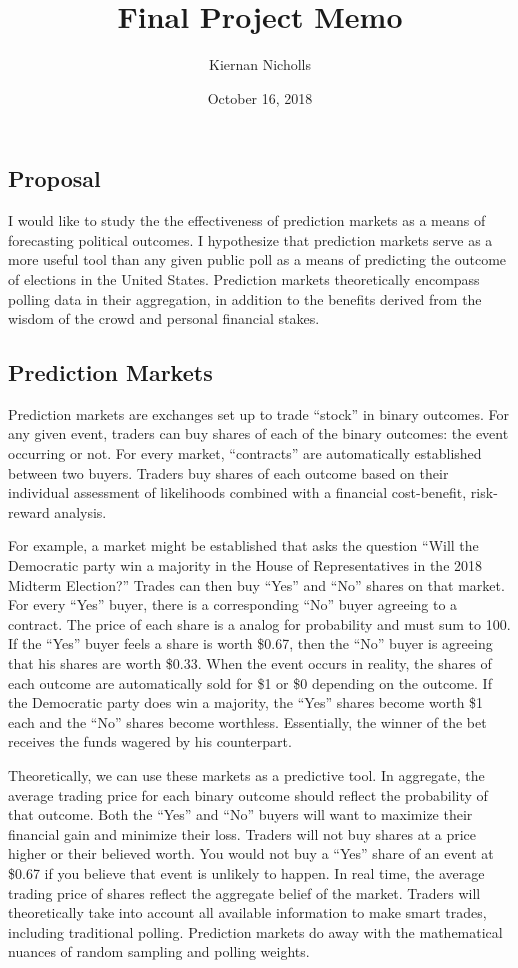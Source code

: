 \documentclass[]{article}
\title{Final Project Memo}
\author{Kiernan Nicholls}
\date{October 16, 2018}
\begin{document}
\maketitle

\subsection{Proposal}\label{proposal}

I would like to study the the effectiveness of prediction markets as a
means of forecasting political outcomes. I hypothesize that prediction
markets serve as a more useful tool than any given public poll as a
means of predicting the outcome of elections in the United States.
Prediction markets theoretically encompass polling data in their
aggregation, in addition to the benefits derived from the wisdom of the
crowd and personal financial stakes.

\subsection{Prediction Markets}\label{prediction-markets}

Prediction markets are exchanges set up to trade ``stock'' in binary
outcomes. For any given event, traders can buy shares of each of the
binary outcomes: the event occurring or not. For every market,
``contracts'' are automatically established between two buyers. Traders
buy shares of each outcome based on their individual assessment of
likelihoods combined with a financial cost-benefit, risk-reward
analysis.

For example, a market might be established that asks the question ``Will
the Democratic party win a majority in the House of Representatives in
the 2018 Midterm Election?'' Trades can then buy ``Yes'' and ``No''
shares on that market. For every ``Yes'' buyer, there is a corresponding
``No'' buyer agreeing to a contract. The price of each share is a analog
for probability and must sum to 100. If the ``Yes'' buyer feels a share
is worth \$0.67, then the ``No'' buyer is agreeing that his shares are
worth \$0.33. When the event occurs in reality, the shares of each
outcome are automatically sold for \$1 or \$0 depending on the outcome.
If the Democratic party does win a majority, the ``Yes'' shares become
worth \$1 each and the ``No'' shares become worthless. Essentially, the
winner of the bet receives the funds wagered by his counterpart.

Theoretically, we can use these markets as a predictive tool. In
aggregate, the average trading price for each binary outcome should
reflect the probability of that outcome. Both the ``Yes'' and ``No''
buyers will want to maximize their financial gain and minimize their
loss. Traders will not buy shares at a price higher or their believed
worth. You would not buy a ``Yes'' share of an event at \$0.67 if you
believe that event is unlikely to happen. In real time, the average
trading price of shares reflect the aggregate belief of the market.
Traders will theoretically take into account all available information
to make smart trades, including traditional polling. Prediction markets
do away with the mathematical nuances of random sampling and polling
weights.
\end{document}
